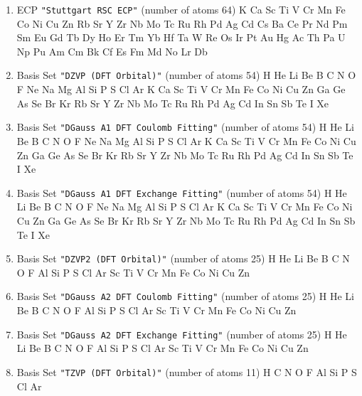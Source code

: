 \begin{enumerate}
\item ECP \verb#"Stuttgart RSC ECP"# (number of atoms 64)  \newline 
  K Ca Sc Ti V Cr Mn Fe Co Ni Cu Zn Rb Sr Y Zr Nb Mo Tc Ru Rh Pd Ag Cd Cs
 Ba Ce Pr Nd Pm Sm Eu Gd Tb Dy Ho Er Tm Yb Hf Ta W Re Os Ir Pt Au Hg Ac Th
 Pa U Np Pu Am Cm Bk Cf Es Fm Md No Lr Db


\item Basis Set \verb#"DZVP (DFT Orbital)"# (number of atoms 54)  \newline 
  H He Li Be B C N O F Ne Na Mg Al Si P S Cl Ar K Ca Sc Ti V Cr Mn
 Fe Co Ni Cu Zn Ga Ge As Se Br Kr Rb Sr Y Zr Nb Mo Tc Ru Rh Pd Ag Cd In Sn
 Sb Te I Xe


\item Basis Set \verb#"DGauss A1 DFT Coulomb Fitting"# (number of atoms 54)  \newline 
  H He Li Be B C N O F Ne Na Mg Al Si P S Cl Ar K Ca Sc Ti V Cr Mn
 Fe Co Ni Cu Zn Ga Ge As Se Br Kr Rb Sr Y Zr Nb Mo Tc Ru Rh Pd Ag Cd In Sn
 Sb Te I Xe


\item Basis Set \verb#"DGauss A1 DFT Exchange Fitting"# (number of atoms 54)  \newline 
  H He Li Be B C N O F Ne Na Mg Al Si P S Cl Ar K Ca Sc Ti V Cr Mn
 Fe Co Ni Cu Zn Ga Ge As Se Br Kr Rb Sr Y Zr Nb Mo Tc Ru Rh Pd Ag Cd In Sn
 Sb Te I Xe


\item Basis Set \verb#"DZVP2 (DFT Orbital)"# (number of atoms 25)  \newline 
  H He Li Be B C N O F Al Si P S Cl Ar Sc Ti V Cr Mn Fe Co Ni Cu Zn



\item Basis Set \verb#"DGauss A2 DFT Coulomb Fitting"# (number of atoms 25)  \newline 
  H He Li Be B C N O F Al Si P S Cl Ar Sc Ti V Cr Mn Fe Co Ni Cu Zn



\item Basis Set \verb#"DGauss A2 DFT Exchange Fitting"# (number of atoms 25)  \newline 
  H He Li Be B C N O F Al Si P S Cl Ar Sc Ti V Cr Mn Fe Co Ni Cu Zn



\item Basis Set \verb#"TZVP (DFT Orbital)"# (number of atoms 11)  \newline 
  H C N O F Al Si P S Cl Ar



\end{enumerate}
